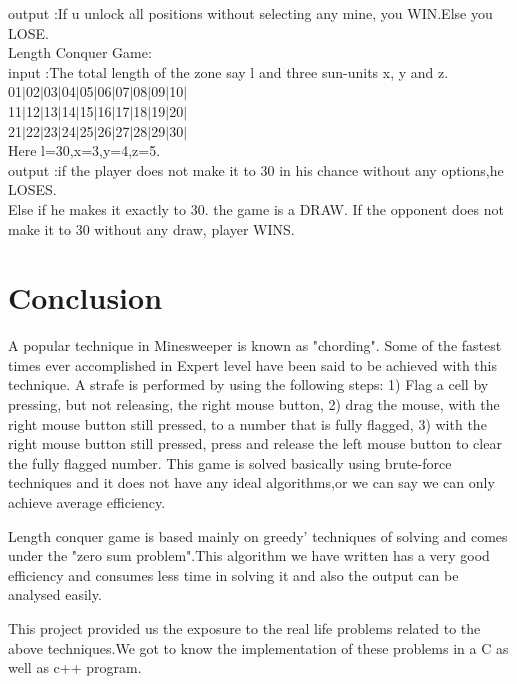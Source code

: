 \documentclass{article}
\begin{document}
output :If u unlock all positions without selecting any mine,
you WIN.Else you LOSE.\\

Length Conquer Game:\\

input :The total length of the zone say l and three sun-units 
x, y and z.\\
01$|$02$|$03$|$04$|$05$|$06$|$07$|$08$|$09$|$10$|$\\
11$|$12$|$13$|$14$|$15$|$16$|$17$|$18$|$19$|$20$|$\\
21$|$22$|$23$|$24$|$25$|$26$|$27$|$28$|$29$|$30$|$\\
Here l=30,x=3,y=4,z=5.\\

output :if the player does not make it to 30 in his chance 
without any options,he LOSES.\\
Else if he makes it exactly to 30. the game is a DRAW.
If the opponent does not make it to 30 without any draw,
player WINS.\\








\newpage
\section{Conclusion}

A popular technique in Minesweeper is known as "chording". Some of the fastest times ever 
accomplished in Expert level have been said to be achieved with this technique. A strafe
is performed by using the following steps: 1) Flag a cell by pressing, but not releasing,
the right mouse button, 2) drag the mouse, with the right mouse button still pressed, to 
a number that is fully flagged, 3) with the right mouse button still pressed, press and 
release the left mouse button to clear the fully flagged number.
This game is solved basically using brute-force techniques and it does not have any ideal
algorithms,or we can say we can only achieve average efficiency.

Length conquer game is based mainly on greedy' techniques of solving and comes under 
the "zero sum problem".This algorithm we have written has a very good efficiency and 
consumes less time in solving it and also the output can be analysed easily.

This project provided us the exposure to the real life problems related to the above
techniques.We got to know the implementation of these problems in a C as well as c++ 
program.
\end{document}
